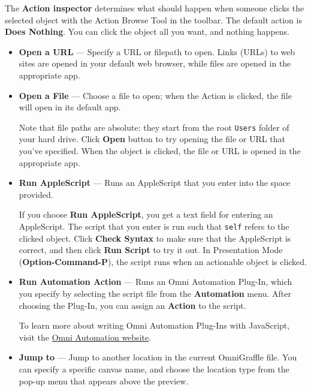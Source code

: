 \documentclass[../main.tex]{subfiles}
\begin{document}
\begin{ogpro}
  The \textbf{Action inspector} determines what should happen when someone clicks the selected
  object with the Action Browse Tool  in the
  toolbar. The default action is \textbf{Does Nothing}. You can click the object all you want,
  and nothing happens.

  \begin{itemize}
    \item \textbf{Open a URL} --- Specify a URL or filepath to open. Links (URLs) to web sites
      are opened in your default web browser, while files are opened in the appropriate app.

    \item \textbf{Open a File} --- Choose a file to open; when the Action is clicked, the file
      will open in its default app.


      Note that file paths are absolute: they start from the root \texttt{Users} folder of your
      hard drive. Click \textbf{Open} button to try opening the file or URL that you've
      specified. When the object is clicked, the file or URL is opened in the appropriate app.
    \item \textbf{Run AppleScript} --- Runs an AppleScript that you enter into the space
      provided.


      If you choose \textbf{Run AppleScript}, you get a text field for entering an AppleScript.
      The script that you enter is run such that \texttt{self} refers to the clicked object.
      Click \textbf{Check Syntax} to make sure that the AppleScript is correct, and then click
      \textbf{Run Script} to try it out. In Presentation Mode (\textbf{Option-Command-P}), the
      script runs when an actionable object is clicked.
    \item \textbf{Run Automation Action} --- Runs an Omni Automation Plug-In, which you specify
      by selecting the script file from the \textbf{Automation} menu. After choosing the
      Plug-In, you can assign an \textbf{Action} to the script.


      To learn more about writing Omni Automation Plug-Ins with JavaScript, visit the
      \href{https://www.omni-automation.com}{Omni Automation website}.
    \item \textbf{Jump to} --- Jump to another location in the current OmniGraffle file. You can
      specify a specific canvas name, and choose the location type from the pop-up menu that
      appears above the preview.


\end{itemize}
\end{ogpro}
\end{document}
